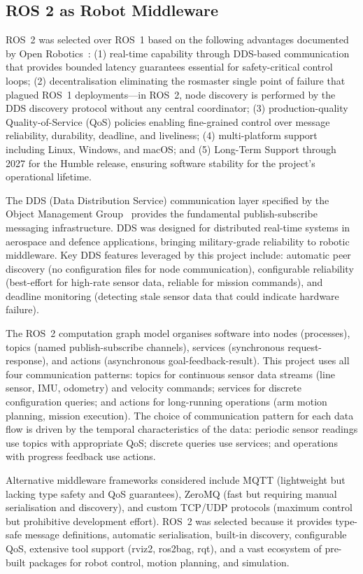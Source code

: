 \documentclass[12pt,a4paper,oneside]{report}
\begin{document}
\subsection{ROS 2 as Robot Middleware}

ROS~2 was selected over ROS~1 based on the following advantages documented by Open Robotics~\cite{openrobotics2023}: (1) real-time capability through DDS-based communication that provides bounded latency guarantees essential for safety-critical control loops; (2) decentralisation eliminating the rosmaster single point of failure that plagued ROS~1 deployments---in ROS~2, node discovery is performed by the DDS discovery protocol without any central coordinator; (3) production-quality Quality-of-Service (QoS) policies enabling fine-grained control over message reliability, durability, deadline, and liveliness; (4) multi-platform support including Linux, Windows, and macOS; and (5) Long-Term Support through 2027 for the Humble release, ensuring software stability for the project's operational lifetime.

The DDS (Data Distribution Service) communication layer specified by the Object Management Group~\cite{omg2015} provides the fundamental publish-subscribe messaging infrastructure. DDS was designed for distributed real-time systems in aerospace and defence applications, bringing military-grade reliability to robotic middleware. Key DDS features leveraged by this project include: automatic peer discovery (no configuration files for node communication), configurable reliability (best-effort for high-rate sensor data, reliable for mission commands), and deadline monitoring (detecting stale sensor data that could indicate hardware failure).

The ROS~2 computation graph model organises software into nodes (processes), topics (named publish-subscribe channels), services (synchronous request-response), and actions (asynchronous goal-feedback-result). This project uses all four communication patterns: topics for continuous sensor data streams (line sensor, IMU, odometry) and velocity commands; services for discrete configuration queries; and actions for long-running operations (arm motion planning, mission execution). The choice of communication pattern for each data flow is driven by the temporal characteristics of the data: periodic sensor readings use topics with appropriate QoS; discrete queries use services; and operations with progress feedback use actions.

Alternative middleware frameworks considered include MQTT (lightweight but lacking type safety and QoS guarantees), ZeroMQ (fast but requiring manual serialisation and discovery), and custom TCP/UDP protocols (maximum control but prohibitive development effort). ROS~2 was selected because it provides type-safe message definitions, automatic serialisation, built-in discovery, configurable QoS, extensive tool support (rviz2, ros2bag, rqt), and a vast ecosystem of pre-built packages for robot control, motion planning, and simulation.
\end{document}
